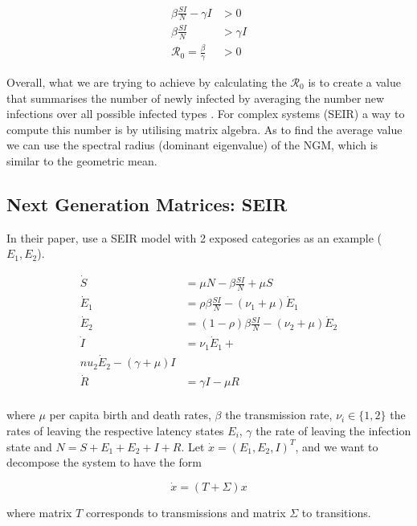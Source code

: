 \documentclass[12pt]{article}
\begin{document}
\begin{align*}
\beta \frac{SI}{N} - \gamma I  & >  0 \\
\beta \frac{SI}{N}  & >  \gamma I  \\
\mathcal{R}_{0} =  \frac{\beta}{\gamma } & >  0 
\end{align*}

Overall, what we are trying to achieve by calculating the $\mathcal{R}_{0} $ is to create a value that summarises the number of newly infected by averaging the number new infections over all possible infected types \cite[p.3]{Jones:2007}. For complex systems (SEIR) a way to compute this number is by utilising matrix algebra. As \cite{Diekmann:2010} to find the average value we can use the spectral radius (dominant eigenvalue) of the NGM, which is similar to the geometric mean. 


\subsection{Next Generation Matrices: SEIR}
\label{sub:2.1}

In their paper, \cite[p.875]{Diekmann:2010} use a SEIR model with 2 exposed categories as an example ($E_{1}, E_{2}$).

\begin{align*}
\dot{S} & =  \mu N - \beta\frac{SI}{N} + \mu S \\
\dot{E}_{1}  & =  \rho \beta \frac{SI}{N} - (\nu_{1} + \mu)\dot{E}_{1} \\
\dot{E}_{2}  & =  (1 - \rho) \beta \frac{SI}{N} - (\nu_{2} + \mu)\dot{E}_{2}\\
\dot{I}  & =  \nu_{1} \dot{E}_{1}  + \\nu_{2} \dot{E}_{2}  - (\gamma + \mu) I \\
\dot{R}  & =  \gamma I - \mu R\\
\end{align*}

where $\mu$ per capita birth and death rates, $\beta$ the transmission rate, $\nu_{i}\in\{1, 2\}$ the rates of leaving the respective latency states $E_{i}$, $\gamma$ the rate of leaving the infection state and $N=S + E_{1} + E_{2} + I + R$.
Let $\dot{x} = (E_{1}, E_{2}, I)^{T}$, and we want to decompose the system to have the form

\begin{equation}
\dot{x} = (T + \Sigma)x
\end{equation} 

where matrix $T$ corresponds to transmissions and matrix $\Sigma$ to transitions. 
\end{document}
